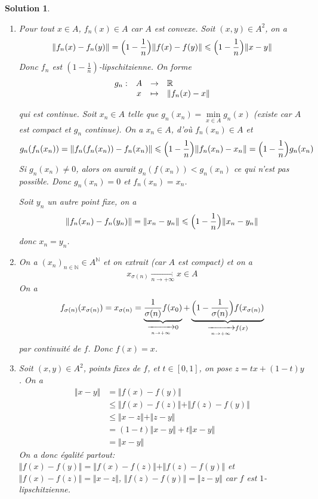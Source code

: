 \documentclass[12pt]{article}
\newtheorem{solution}{Solution}[section]
\theoremstyle{remark}
\newcommand{\N}{\mathbb{N}} \newcommand{\Z}{\mathbb{Z}}
\newcommand{\function}[5]{
	$$
	\begin{array}{rccl}
		#1: & #2 & \to & #3 \\
		& #4 & \mapsto & #5
	\end{array}
	$$
}
\numberwithin{equation}{section}
\begin{document}
\begin{solution}
	\phantom{}
	\begin{enumerate}
		\item Pour tout $x\in A$, $f_{n}(x)\in A$ car $A$ est convexe. Soit $(x,y)\in A^{2}$, on a
		$$\Vert f_{n}(x)-f_{n}(y)\Vert=\Bigl(1-\frac{1}{n}\Bigr)\Vert f(x)-f(y)\Vert\leqslant\Bigl(1-\frac{1}{n}\Bigr)\Vert x-y\Vert$$
		Donc $f_{n}$ est $(1-\frac{1}{n})$-lipschitzienne. On forme \function{g_n}{A}{\R}{x}{\Vert f_n(x)-x\Vert}
		qui est continue. Soit $x_{n}\in A$ telle que $g_{n}(x_{n})=\min\limits_{x\in A}g_{n}(x)$ (existe car $A$ est compact et $g_{n}$ continue). On a $x_{n}\in A$, d'où $f_{n}(x_{n})\in A$ et 
		$$g_{n}(f_{n}(x_{n}))=\Vert f_{n}(f_{n}(x_{n}))-f_{n}(x_{n})\Vert\leqslant\Bigl(1-\frac{1}{n}\Bigr)\Vert f_{n}(x_{n})-x_{n}\Vert=\Bigl(1-\frac{1}{n}\Bigr)g_{n}(x_{n})$$
		Si $g_{n}(x_{n})\neq0$, alors on aurait $g_{n}(f(x_{n}))<g_{n}(x_{n})$ ce qui n'est pas possible. Donc $g_{n}(x_{n})=0$ et $f_{n}(x_{n})=x_{n}$.

		Soit $y_{n}$ un autre point fixe, on a 
		$$\Vert f_{n}(x_{n})-f_{n}(y_{n})\Vert=\Vert x_{n}-y_{n}\Vert\leqslant\Bigl(1-\frac{1}{n}\Bigr)\Vert x_{n}-y_{n}\Vert$$
		donc $x_{n}=y_{n}$.

		\item On a $(x_{n})_{n\in\N}\in A^{\N}$ et on extrait (car $A$ est compact) et on a 
		$$x_{\sigma(n)}\xrightarrow[n\to+\infty]{}x\in A$$
		On a 
		$$f_{\sigma(n)}(x_{\sigma(n)})=x_{\sigma(n)}=\underbrace{\frac{1}{\sigma(n)}f(x_{0})}_{\xrightarrow[n\to+\infty]{}0}+\underbrace{\Bigl(1-\frac{1}{\sigma(n)}\Bigr)f(x_{\sigma(n)})}_{\xrightarrow[n\to+\infty]{}f(x)}$$
		par continuité de $f$. Donc $f(x)=x$.

		\item Soit $(x,y)\in A^{2}$, points fixes de $f$, et $t\in[0,1]$, on pose $z=tx+(1-t)y$. On a 
		\begin{align*}
			\Vert x-y\Vert
			&=\Vert f(x)-f(y)\Vert\\
			&\leqslant \Vert f(x)-f(z)\Vert+\Vert f(z)-f(y)\Vert\\
			&\leqslant\Vert x-z\Vert+\Vert z-y\Vert\\
			&=(1-t)\Vert x-y\Vert+t\Vert x-y\Vert\\
			&=\Vert x-y\Vert
		\end{align*}
		On a donc égalité partout: $\Vert f(x)-f(y)\Vert=\Vert f(x)-f(z)\Vert+\Vert f(z)-f(y)\Vert$ et $\Vert f(x)-f(z)\Vert=\Vert x-z\Vert$, $\Vert f(z)-f(y)\Vert=\Vert z-y\Vert$ car $f$ est $1$-lipschitzienne.


\end{enumerate}
\end{solution}
\end{document}
